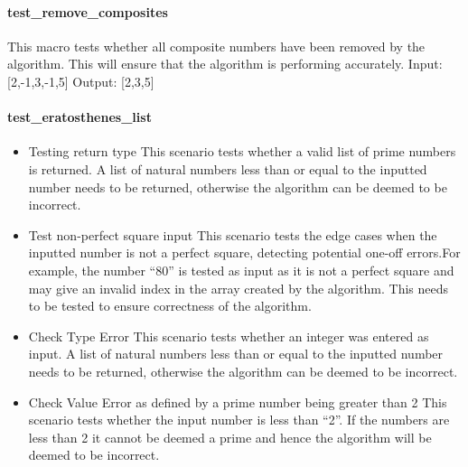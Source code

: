 \documentclass[]{article}
\begin{document}
\paragraph{test\_remove\_composites}
This macro tests whether all composite numbers have been removed by the algorithm. This will ensure that the algorithm is performing accurately.
\hfill \newline
Input: [2,-1,3,-1,5]
Output: [2,3,5]

\paragraph{test\_eratosthenes\_list}
\begin{itemize}


\item Testing return type \hfill \newline\newline
This scenario tests whether a valid list of prime numbers is returned. A list of natural numbers less than or equal to the inputted number needs to be returned, otherwise the algorithm can be deemed to be incorrect.
\item Test non-perfect square input \hfill \newline\newline
This scenario tests the edge cases when the inputted number is not a perfect square, detecting potential one-off errors.For example, the number “80” is tested as input as it is not a perfect square and may give an invalid index in the array created by the algorithm. This needs to be tested to ensure correctness of the algorithm.
\item Check Type Error \hfill \newline\newline
This scenario tests whether an integer was entered as input. A list of natural numbers less than or equal to the inputted number needs to be returned, otherwise the algorithm can be deemed to be incorrect.
\item Check Value Error as defined by a prime number being greater than 2 \hfill \newline\newline
This scenario tests whether the input number is less than “2”. If the numbers are less than 2 it cannot be deemed a prime and hence the algorithm will be deemed to be incorrect.
\end{itemize}
\end{document}
